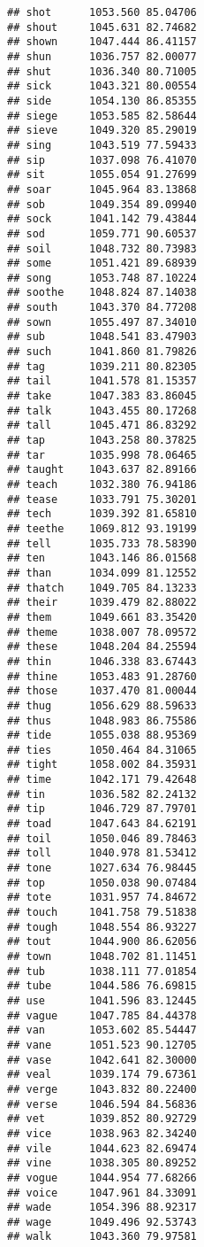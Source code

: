 \documentclass[
]{article}
\begin{document}
\begin{verbatim}
## shot      1053.560 85.04706
## shout     1045.631 82.74682
## shown     1047.444 86.41157
## shun      1036.757 82.00077
## shut      1036.340 80.71005
## sick      1043.321 80.00554
## side      1054.130 86.85355
## siege     1053.585 82.58644
## sieve     1049.320 85.29019
## sing      1043.519 77.59433
## sip       1037.098 76.41070
## sit       1055.054 91.27699
## soar      1045.964 83.13868
## sob       1049.354 89.09940
## sock      1041.142 79.43844
## sod       1059.771 90.60537
## soil      1048.732 80.73983
## some      1051.421 89.68939
## song      1053.748 87.10224
## soothe    1048.824 87.14038
## south     1043.370 84.77208
## sown      1055.497 87.34010
## sub       1048.541 83.47903
## such      1041.860 81.79826
## tag       1039.211 80.82305
## tail      1041.578 81.15357
## take      1047.383 83.86045
## talk      1043.455 80.17268
## tall      1045.471 86.83292
## tap       1043.258 80.37825
## tar       1035.998 78.06465
## taught    1043.637 82.89166
## teach     1032.380 76.94186
## tease     1033.791 75.30201
## tech      1039.392 81.65810
## teethe    1069.812 93.19199
## tell      1035.733 78.58390
## ten       1043.146 86.01568
## than      1034.099 81.12552
## thatch    1049.705 84.13233
## their     1039.479 82.88022
## them      1049.661 83.35420
## theme     1038.007 78.09572
## these     1048.204 84.25594
## thin      1046.338 83.67443
## thine     1053.483 91.28760
## those     1037.470 81.00044
## thug      1056.629 88.59633
## thus      1048.983 86.75586
## tide      1055.038 88.95369
## ties      1050.464 84.31065
## tight     1058.002 84.35931
## time      1042.171 79.42648
## tin       1036.582 82.24132
## tip       1046.729 87.79701
## toad      1047.643 84.62191
## toil      1050.046 89.78463
## toll      1040.978 81.53412
## tone      1027.634 76.98445
## top       1050.038 90.07484
## tote      1031.957 74.84672
## touch     1041.758 79.51838
## tough     1048.554 86.93227
## tout      1044.900 86.62056
## town      1048.702 81.11451
## tub       1038.111 77.01854
## tube      1044.586 76.69815
## use       1041.596 83.12445
## vague     1047.785 84.44378
## van       1053.602 85.54447
## vane      1051.523 90.12705
## vase      1042.641 82.30000
## veal      1039.174 79.67361
## verge     1043.832 80.22400
## verse     1046.594 84.56836
## vet       1039.852 80.92729
## vice      1038.963 82.34240
## vile      1044.623 82.69474
## vine      1038.305 80.89252
## vogue     1044.954 77.68266
## voice     1047.961 84.33091
## wade      1054.396 88.92317
## wage      1049.496 92.53743
## walk      1043.360 79.97581

\end{verbatim}
\end{document}
